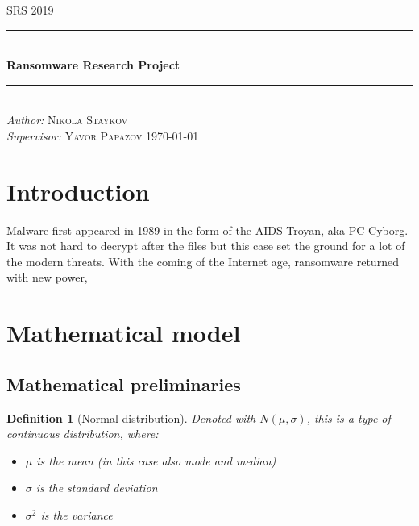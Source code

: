 \documentclass[11pt, a4paper]{article}
\newtheorem{definition}{Definition}
\begin{document}
\begin{titlepage}
	\newcommand{\HRule}{\rule{\linewidth}{0.5mm}}
	\centering
	\textsc{\LARGE SRS 2019}\\[1cm]
	\HRule\\[1 cm]
	
	{\huge\bfseries Ransomware Research Project }\\[0.5 cm] 
	\HRule\\
    \vfill
			\Large
			\textit{Author:}
			 \textsc{Nikola Staykov}\\
             \vspace{2cm}
			\Large
			\textit{Supervisor:}
            \textsc{Yavor Papazov}
    \vfill	
	{\large\today}   
	\vfill
\end{titlepage}

\tableofcontents
\newpage
\begin{abstract}
		Malware is a type of computer virus, which encrypts the files on a given system and asks for a ransom in order for them to be decrypted. Ransomware authors have no way of knowing their victim's data value, or more precisely what people \textit{think} their data costs. They can, however, make small surveys before launching the main campaign, in order to estimate the aforementioned distribution. This paper explores a model in order to find the most suitable parameters for such a survey. This approach is key to finding the best price for the ransom.
\end{abstract}

\section{Introduction}
		Malware first appeared in 1989 in the form of the AIDS Troyan, aka PC Cyborg. It was not hard to decrypt after the files but this case set the ground for a lot of the modern threats. With the coming of the Internet age, ransomware returned with new power, 
\newpage
\section{Mathematical model}
	\subsection{Mathematical preliminaries}
		\begin{definition}[Normal distribution]
			\label{def:def1}
			Denoted with $N(\mu, \sigma)$, this is a type of continuous distribution, where:
			\begin{itemize}
				\item $\mu$ is the mean (in this case also mode and median)
				\item $\sigma$ is the standard deviation
				\item $\sigma^{2}$ is the variance
				
			\end{itemize}
		\end{definition}
	
\end{document}

